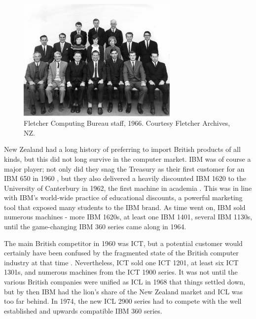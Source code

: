 \documentclass{IEEEcsmag}
\begin{document}
\begin{figure}
\centerline{\includegraphics[width=18.5pc]{FletcherStaff1966.jpg}}
\caption{\label{Staff1966}Fletcher Computing Bureau staff, 1966. Courtesy Fletcher Archives, NZ.}\vspace*{-5pt}
\end{figure}

New Zealand had a long history of preferring to import British products of all kinds, but this did not long survive in the computer market. IBM was of course a major player; not only did they snag the Treasury as their first customer for an IBM 650 in 1960 \cite{FirstCinNZ}, but they also delivered a heavily discounted IBM 1620 to the University of Canterbury in 1962, the first machine in academia \cite{Dale-Canty2}. This was in line with IBM's world-wide practice of educational discounts, a powerful marketing tool that exposed many students to the IBM brand. As time went on, IBM sold numerous machines - more IBM 1620s, at least one IBM 1401, several IBM 1130s, until the game-changing IBM 360 series came along in 1964.

The main British competitor in 1960 was ICT, but a potential customer would certainly have been confused by the fragmented state of the British computer industry at that time \cite{Hendry-1989}.
Nevertheless, ICT sold one ICT 1201, at least six ICT 1301s, and numerous machines from the ICT 1900 series.
It was not until the various British companies were unified as ICL in 1968 that things settled down, but by then IBM had the lion's share of the New Zealand market and ICL was too far behind. In 1974, the new ICL 2900 series had to compete with the well established and upwards compatible IBM 360 series.
\end{document}
